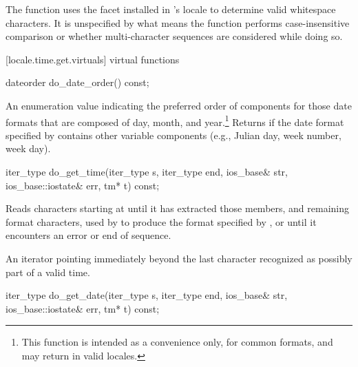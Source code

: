 \begin{itemdescr}
\pnum
\begin{note} The function uses the 
facet installed in 's locale
to determine valid whitespace characters. It is unspecified by what
means the function performs case-insensitive comparison or whether
multi-character sequences are considered while doing so. \end{note}

\pnum
\returns {}
\end{itemdescr}

[locale.time.get.virtuals]{ virtual functions}

%
\begin{itemdecl}
dateorder do_date_order() const;
\end{itemdecl}

\begin{itemdescr}
\pnum
\returns
An enumeration value indicating the preferred order of components for
those date formats that are composed of day, month, and year.\footnote{This
function is intended as a convenience only, for common
formats, and may return
in valid locales.}
Returns
if the date format specified by
contains other variable components (e.g., Julian day, week number, week day).
\end{itemdescr}

%
\begin{itemdecl}
iter_type do_get_time(iter_type s, iter_type end, ios_base& str,
                      ios_base::iostate& err, tm* t) const;
\end{itemdecl}

\begin{itemdescr}
\pnum
\effects
Reads characters starting at 
until it has extracted those
members, and remaining format characters, used by
to produce the format specified by
,
or until it encounters an error or end of sequence.

\pnum
\returns
An iterator pointing immediately beyond the last character recognized
as possibly part of a valid time.
\end{itemdescr}

%
\begin{itemdecl}
iter_type do_get_date(iter_type s, iter_type end, ios_base& str,
                      ios_base::iostate& err, tm* t) const;
\end{itemdecl}

